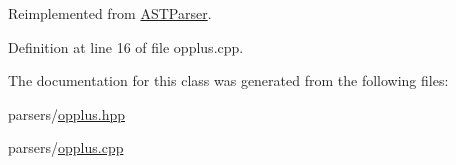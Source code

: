 Reimplemented from \hyperlink{class_a_s_t_parser_ab514c1a1b88592974cb6c2f94f482127}{A\+S\+T\+Parser}.



Definition at line 16 of file opplus.\+cpp.



The documentation for this class was generated from the following files\+:\begin{DoxyCompactItemize}
\item 
parsers/\hyperlink{opplus_8hpp}{opplus.\+hpp}\item 
parsers/\hyperlink{opplus_8cpp}{opplus.\+cpp}\end{DoxyCompactItemize}

